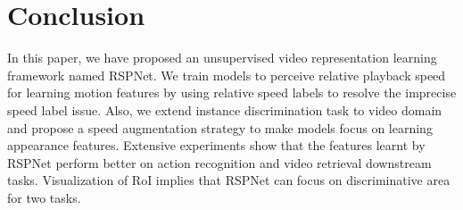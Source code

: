 \documentclass[final]{cvpr}
\begin{document}
\section{Conclusion}
In this paper, we have proposed an unsupervised video representation learning framework named RSPNet. 
We train models to perceive relative playback speed for learning motion features by using relative speed labels to resolve the imprecise speed label issue. Also, we extend instance discrimination task to video domain and propose a speed augmentation strategy to make models focus on learning appearance features.
Extensive experiments show that the features learnt by RSPNet perform better on action recognition and video retrieval downstream tasks. 
Visualization of RoI implies that RSPNet can focus on discriminative area for two tasks.


{\small
	
	
}
\end{document}

